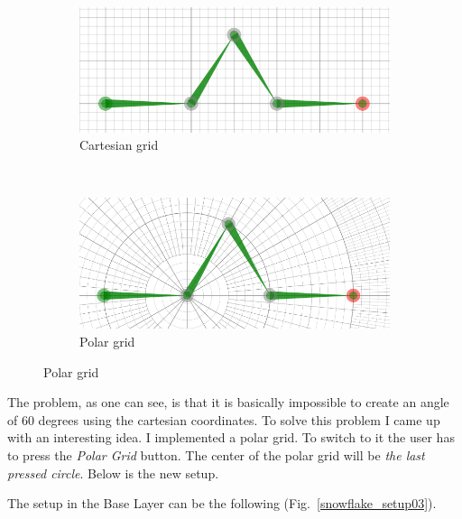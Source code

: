             \begin{figure}[ht]
                \caption{Koch Snowflake.}
                \centering
                \begin{subfigure}[b]{0.49\textwidth}
                    \includegraphics[width=\textwidth]{img/snowflake_setup.png}
                    \caption{Cartesian grid \label{snowflake_setup}}
                \end{subfigure}
                ~
                \begin{subfigure}[b]{0.49\textwidth}
                    \includegraphics[width=\textwidth]{img/snowflake_setup02.png}
                    \caption{Polar grid \label{snowflake_setup_02}}
                \end{subfigure}
            \end{figure}

            The problem, as one can see, is that it is basically impossible to create an angle of 60 degrees using the cartesian coordinates.
            To solve this problem I came up with an interesting idea.
            I implemented a polar grid.
            To switch to it the user has to press the \emph{Polar Grid} button.
            The center of the polar grid will be \emph{the last pressed circle}.
            Below is the new setup.

            The setup in the Base Layer can be the following (Fig.~\ref{snowflake_setup03}).

